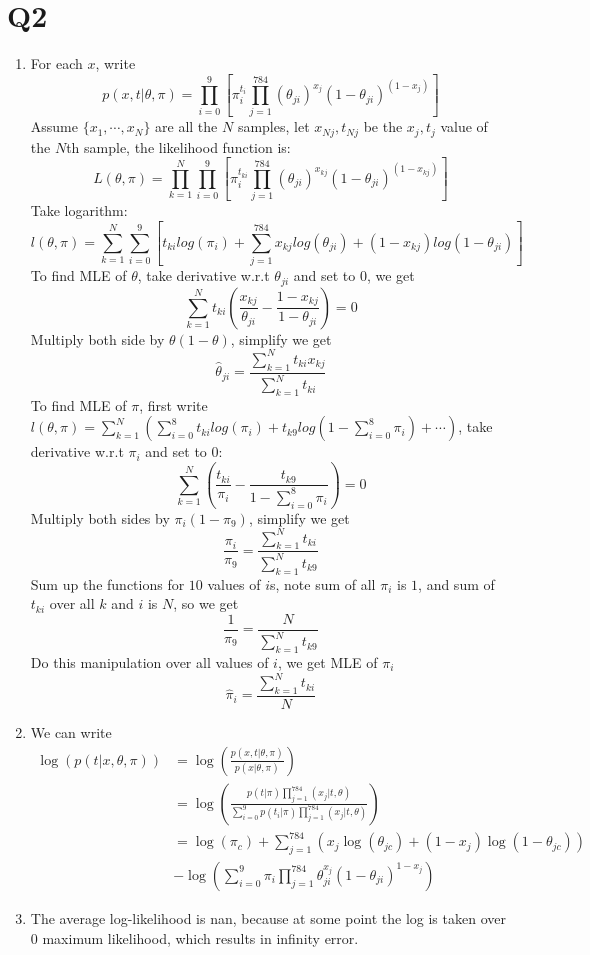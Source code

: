 \documentclass[12pt]{article}
\begin{document}
	\section*{Q2}
	\begin{enumerate}[label=\alph*)]
		\item For each $x$, write \[p(x,t|\theta,\pi)=\prod^9_{i=0}[\pi_i^{t_i}
		\prod^{784}_{j=1}(\theta_{ji})^{x_j}(1-\theta_{ji})^{(1-x_j)}]\]
		Assume $\{x_1,\cdots,x_N\}$ are all the $N$ samples, let $x_{Nj},t_{Nj}$ be the $x_j,t_j$ value of the $N$th sample, the likelihood function is:
		\[L(\theta,\pi)=\prod_{k=1}^{N}\prod^9_{i=0}[\pi_i^{t_{ki}}
		\prod^{784}_{j=1}(\theta_{ji})^{x_{kj}}(1-\theta_{ji})^{(1-x_{kj})}]\]
		Take logarithm:
		\[l(\theta,\pi)=\sum^N_{k=1}\sum^9_{i=0}[t_{ki}log(\pi_i)+\sum^{784}_{j=1}x_{kj}log(\theta_{ji})+(1-x_{kj})log(1-\theta_{ji})]\]
		To find MLE of $\theta$, take derivative w.r.t $\theta_{ji}$ and set to $0$, we get\[
			\sum^N_{k=1}t_{ki}(\frac{x_{kj}}{\theta_{ji}}-\frac{1-x_{kj}}{1-\theta_{ji}})=0
		\]
		Multiply both side by $\theta(1-\theta)$, simplify we get
		\[\hat{\theta}_{ji}=\frac{\sum^N_{k=1}t_{ki}x_{kj}}{\sum^N_{k=1}t_{ki}}\]
		To find MLE of $\pi$, first write $l(\theta,\pi)=\sum^N_{k=1}(\sum^8_{i=0}t_{ki}log(\pi_i)+t_{k9}log(1-\sum^8_{i=0}\pi_i)+\cdots)$, take derivative w.r.t $\pi_i$ and set to $0$:
		\[\sum^N_{k=1}(\frac{t_{ki}}{\pi_i}-\frac{t_{k9}}{1-\sum^8_{i=0}\pi_i})=0\]
		Multiply both sides by $\pi_i(1-\pi_9)$, simplify we get
		\[\frac{\pi_i}{\pi_9}=\frac{\sum^N_{k=1}t_{ki}}{\sum^N_{k=1}t_{k9}}\]
		Sum up the functions for $10$ values of $i$s, note sum of all $\pi_i$ is $1$, and sum of $t_{ki}$ over all $k$ and $i$ is $N$, so we get
		\[\frac{1}{\pi_9}=\frac{N}{\sum^N_{k=1}t_{k9}}\]
		Do this manipulation over all values of $i$, we get MLE of $\pi_i$
		\[\hat{\pi}_i=\frac{\sum^N_{k=1}t_{ki}}{N}\]
		\item We can write
		\begin{align*}
			\log(p(t|x,\theta,\pi))&=\log(\frac{p(x,t|\theta,\pi)}{p(x|\theta,\pi)})\\
			&=\log(\frac{p(t|\pi)\prod^{784}_{j=1}(x_j|t,\theta)}{\sum^9_{i=0}p(t_i|\pi)\prod^{784}_{j=1}(x_j|t,\theta)})\\
			&=\log(\pi_c)+\sum^{784}_{j=1}(x_j\log(\theta_{jc})+(1-x_j)\log(1-\theta_{jc}))\\
			&-\log(\sum^9_{i=0}\pi_i\prod^{784}_{j=1}\theta_{ji}^{x_j}(1-\theta_{ji})^{1-x_j})
		\end{align*}
		\item The average log-likelihood is nan, because at some point the log is taken over $0$ maximum likelihood, which results in infinity error.

\end{enumerate}
\end{document}
